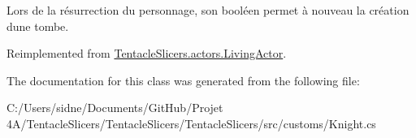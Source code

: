 Lors de la résurrection du personnage, son booléen permet à nouveau la création d\textquotesingle{}une tombe. 



Reimplemented from \hyperlink{class_tentacle_slicers_1_1actors_1_1_living_actor_a7a2b73efca826044f8d15bdc94e13cf7}{Tentacle\+Slicers.\+actors.\+Living\+Actor}.



The documentation for this class was generated from the following file\+:\begin{DoxyCompactItemize}
\item 
C\+:/\+Users/sidne/\+Documents/\+Git\+Hub/\+Projet 4\+A/\+Tentacle\+Slicers/\+Tentacle\+Slicers/\+Tentacle\+Slicers/src/customs/Knight.\+cs\end{DoxyCompactItemize}

